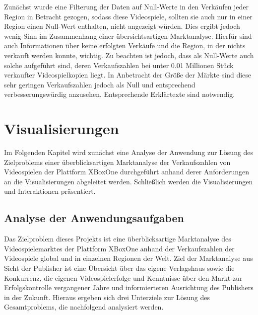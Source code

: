 \documentclass[usegeometry=true]{scrartcl}
\begin{document}
Zunächst wurde eine Filterung der Daten auf Null-Werte in den Verkäufen jeder Region in Betracht gezogen, sodass diese Videospiele, sollten sie auch nur in einer Region einen Null-Wert enthalten, nicht angezeigt würden. 
Dies ergibt jedoch wenig Sinn im Zusammenhang einer übersichtsartigen Marktanalyse. Hierfür sind auch Informationen über keine erfolgten Verkäufe und die Region, in der nichts verkauft werden konnte, wichtig. 
Zu beachten ist jedoch, dass als Null-Werte auch solche aufgeführt sind, deren Verkaufszahlen bei unter 0.01 Millionen Stück verkaufter Videospielkopien liegt. 
In Anbetracht der Größe der Märkte sind diese sehr geringen Verkaufszahlen jedoch als Null und entsprechend verbesserungswürdig anzusehen.
Entsprechende Erklärtexte sind notwendig.


\section{Visualisierungen}
Im Folgenden Kapitel wird zunächst eine Analyse der Anwendung zur Lösung des Zielproblems einer überblicksartigen Marktanalyse der Verkaufszahlen von Videospielen der Plattform XBoxOne durchgeführt anhand derer Anforderungen an die Visualisierungen abgeleitet werden. 
Schließlich werden die Visualisierungen und Interaktionen präsentiert.

\subsection{Analyse der Anwendungsaufgaben}
Das Zielproblem dieses Projekts ist eine überblicksartige Marktanalyse des Videospielemarktes der Plattform XBoxOne anhand der Verkaufszahlen der Videospiele global und in einzelnen Regionen der Welt.
Ziel der Marktanalyse aus Sicht der Publisher ist eine Übersicht über das eigene Verlagshaus sowie die Konkurrenz, die eigenen Videospielerfolge und Kenntnisse über den Markt zur Erfolgskontrolle vergangener Jahre und informierteren Ausrichtung des Publishers in der Zukunft.
Hieraus ergeben sich drei Unterziele zur Lösung des Gesamtproblems, die nachfolgend analysiert werden.
\end{document}

